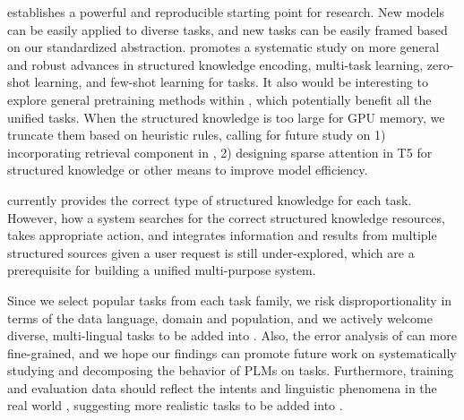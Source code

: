 \uskg establishes a powerful and reproducible starting point for \skg research. New models can be easily applied to diverse \skg tasks, and new tasks can be easily framed based on our standardized abstraction.
\uskg promotes a systematic study on more general and robust advances in structured knowledge encoding, multi-task learning, zero-shot learning, and few-shot learning for \skg tasks.
It also would be interesting to explore general pretraining methods within \uskg, which potentially benefit all the unified tasks. 
When the structured knowledge is too large for GPU memory, we truncate them based on heuristic rules,
calling for future study on 1) incorporating retrieval component in \skg, 
2) designing sparse attention in T5 for structured knowledge or other means to improve model efficiency. 

\uskg currently provides the correct type of structured knowledge for each task. 
However, how a system searches for the correct structured knowledge resources, takes appropriate action, and integrates information and results from multiple structured sources given a user request is still under-explored, which are a prerequisite for building a unified multi-purpose \skg system. 

Since we select popular tasks from each task family, we risk disproportionality in terms of the data language,  domain and population, and we actively welcome diverse, multi-lingual tasks to be added into \uskg. 
Also, the error analysis of \skg can more fine-grained, and we hope our findings can promote future work on systematically studying and decomposing the behavior of PLMs on \skg tasks. 
Furthermore, training and evaluation data should reflect the intents and linguistic phenomena in the real world \cite{Vries2020TowardsEV}, suggesting more realistic tasks to be added into \uskg. 
\clearpage

\clearpage

